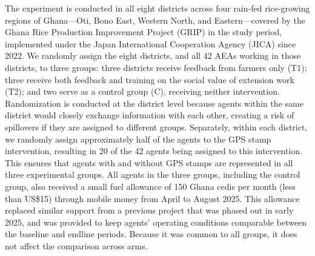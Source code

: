 \documentclass[11pt]{article}
\begin{document}
The experiment is conducted in all eight districts across four rain-fed rice-growing regions of Ghana---Oti, Bono East, Western North, and Eastern---covered by the Ghana Rice Production Improvement Project (GRIP) in the study period, implemented under the Japan International Cooperation Agency (JICA) since 2022. We randomly assign the eight districts, and all 42 AEAs working in those districts, to three groups: three districts receive feedback from farmers only (T1); three receive both feedback and training on the social value of extension work (T2); and two serve as a control group (C), receiving neither intervention. Randomization is conducted at the district level because agents within the same district would closely exchange information with each other, creating a risk of spillovers if they are assigned to different groups. Separately, within each district, we randomly assign approximately half of the agents to the GPS stamp intervention, resulting in 20 of the 42 agents being assigned to this intervention. This ensures that agents with and without GPS stamps are represented in all three experimental groups. All agents in the three groups, including the control group, also received a small fuel allowance of 150 Ghana cedis per month (less than US\$15) through mobile money from April to August 2025. This allowance replaced similar support from a previous project that was phased out in early 2025, and was provided to keep agents’ operating conditions comparable between the baseline and endline periods. Because it was common to all groups, it does not affect the comparison across arms.
\end{document}
